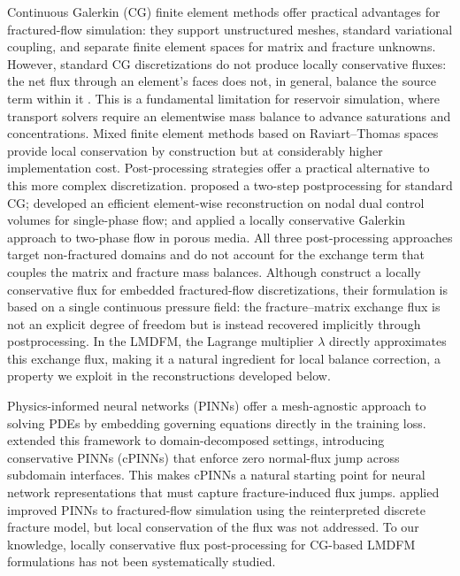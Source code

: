 \documentclass[a4paper,fleqn]{cas-sc}
\begin{document}
Continuous Galerkin (CG) finite element methods offer practical advantages for fractured-flow simulation:
they support unstructured meshes, standard variational coupling, and separate finite element spaces for
matrix and fracture unknowns. However, standard CG discretizations
do not produce locally conservative fluxes: the net flux through an element's faces does not, in general,
balance the source term within it \citep{DENG2019166}. This is a fundamental limitation for reservoir
simulation, where transport solvers require an elementwise mass balance to advance saturations and
concentrations. Mixed finite element methods based on Raviart--Thomas spaces \citep{raviart2006mixed, brezzi1991mixed}
provide local conservation by construction but at considerably higher implementation cost. Post-processing
strategies offer a practical alternative to this more complex discretization. \citet{cockburn2007} proposed
a two-step postprocessing for standard CG; \citet{DENG2019166} developed an efficient element-wise
reconstruction on nodal dual control volumes for single-phase flow; and \citet{ZHANG201339} applied a
locally conservative Galerkin approach to two-phase flow in porous media. All three post-processing approaches target non-fractured domains and do not account for the exchange
term that couples the matrix and fracture mass balances. Although \citet{ODSAETER2019edfm} construct a
locally conservative flux for embedded fractured-flow discretizations, their formulation is based on a
single continuous pressure field: the fracture--matrix exchange flux is not an explicit degree of freedom
but is instead recovered implicitly through postprocessing. In the LMDFM, the Lagrange multiplier
$\lambda$ directly approximates this exchange flux, making it a natural ingredient for local balance
correction, a property we exploit in the reconstructions developed below.

Physics-informed neural networks (PINNs) \citep{Raissi2019} offer a mesh-agnostic approach to solving
PDEs by embedding governing equations directly in the training loss. \citet{Jagtap2020} extended this framework to domain-decomposed settings, introducing
conservative PINNs (cPINNs) that enforce zero normal-flux jump across subdomain interfaces.
This makes cPINNs a natural starting point for neural network representations
that must capture fracture-induced flux jumps. \citet{Wang2025} applied improved PINNs to fractured-flow simulation using the reinterpreted
discrete fracture model, but local conservation of the flux was not addressed. To our knowledge, locally conservative flux post-processing for CG-based LMDFM formulations has not been systematically studied.
\end{document}

